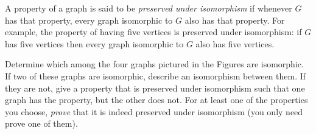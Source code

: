 \documentclass[twoside,12pt]{article}
\begin{document}
\begin{problem}{10}

A property of a graph is said to be \emph{preserved under isomorphism} if
whenever $G$ has that property, every graph isomorphic to $G$ also has
that property.  For example, the property of having five vertices is
preserved under isomorphism: if $G$ has five vertices then every graph
isomorphic to $G$ also has five vertices.

Determine which among the four graphs pictured in the Figures 
are isomorphic.  If two of these graphs are isomorphic, describe an
isomorphism between them.  If they are not, give a property that is
preserved under isomorphism such that one graph has the property, but the
other does not.  For at least one of the properties you choose,
\emph{prove} that it is indeed preserved under isomorphism (you only need
prove one of them).


\end{problem}
\end{document}

